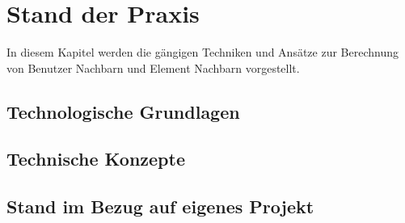 \chapter{Stand der Praxis}
\label{ch:StandDerPraxis}

In diesem Kapitel werden die gängigen Techniken und Ansätze zur Berechnung von Benutzer Nachbarn und Element Nachbarn vorgestellt.

\section{Technologische Grundlagen}

\section{Technische Konzepte}
\label{sec:technischeKonzepte}

\section{Stand im Bezug auf eigenes Projekt}
